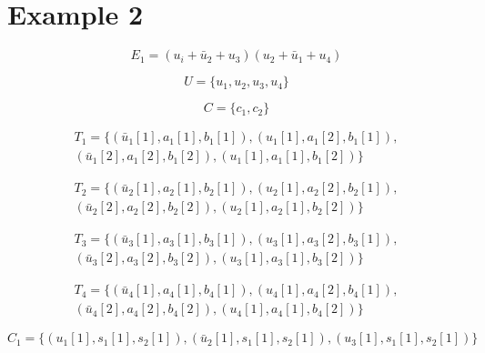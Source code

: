 \documentclass{article}
\begin{document}
\section{Example 2}

\begin{equation*}
E_1 =  ( u_i + \bar{u}_2 + u_3  ) ( u_2 + \bar{u}_1 + u_4  )
\end{equation*}

\begin{equation*}
U =  \{ u_1, u_2, u_3, u_4  \}
\end{equation*}

\begin{equation*}
C =  \{ c_1, c_2  \}
\end{equation*}

\begin{equation*}
\begin{split}
  T_1 =  \{  ( \bar{u}_1[1], a_1[1], b_1[1] ), ( u_1[1], a_1[2], b_1[1] ),\\
  ( \bar{u}_1[2], a_1[2], b_1[2] ), ( u_1[1], a_1[1], b_1[2] ) \}
\end{split}
\end{equation*}

\begin{equation*}
\begin{split}  
  T_2 =  \{  ( \bar{u}_2[1], a_2[1], b_2[1] ), ( u_2[1],  a_2[2], b_2[1] ),\\
  ( \bar{u}_2[2], a_2[2], b_2[2] ), ( u_2[1], a_2[1], b_2[2] ) \}
\end{split}  
\end{equation*}

\begin{equation*}
\begin{split}
  T_3 =  \{  ( \bar{u}_3[1], a_3[1], b_3[1] ), ( u_3[1],  a_3[2], b_3[1] ),\\
  ( \bar{u}_3[2], a_3[2], b_3[2] ), ( u_3[1], a_3[1], b_3[2] ) \}
\end{split}
\end{equation*}

\begin{equation*}
\begin{split}
  T_4 =  \{  ( \bar{u}_4[1], a_4[1], b_4[1] ), ( u_4[1],  a_4[2], b_4[1] ),\\
  ( \bar{u}_4[2], a_4[2], b_4[2] ), ( u_4[1], a_4[1], b_4[2] ) \}
\end{split}
\end{equation*}

\begin{equation*}
  C_1 =  \{  ( u_1[1],  s_1[1], s_2[1]   ),  ( \bar{u}_2[1],  s_1[1], s_2[1]  ),  ( u_3[1],  s_1[1], s_2[1]   )  \}
\end{equation*}
\end{document}

